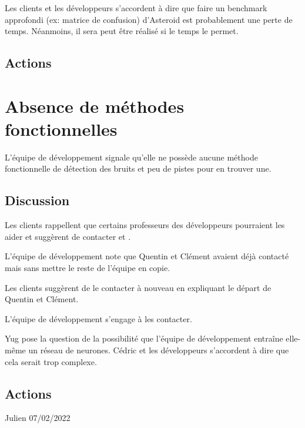 \documentclass{article}
\begin{document}
Les clients et les développeurs s'accordent à dire que faire un benchmark approfondi (ex: matrice de confusion) d'Asteroid est probablement une perte de temps. Néanmoins, il sera peut être réalisé si le temps le permet.

\subsection{Actions}

\begin{actionlist}
\end{actionlist}


\section{Absence de méthodes fonctionnelles}

L'équipe de développement signale qu'elle ne possède aucune méthode fonctionnelle de détection des bruits et peu de pistes pour en trouver une.

\subsection{Discussion}

Les clients rappellent que certains professeurs des développeurs pourraient les aider et suggèrent de contacter  et .

L'équipe de développement note que Quentin et Clément avaient déjà contacté  mais sans mettre le reste de l'équipe en copie.

Les clients suggèrent de le contacter à nouveau en expliquant le départ de Quentin et Clément.

L'équipe de développement s'engage à les contacter.

Yug pose la question de la possibilité que l'équipe de développement entraîne elle-même un réseau de neurones. Cédric  et les développeurs s'accordent à dire que cela serait trop complexe.

\subsection{Actions}

\begin{actionlist}
                        {Julien }{07/02/2022}{\actionNouvelle}
\end{actionlist}
\end{document}
